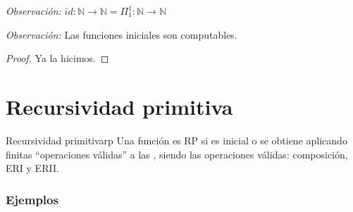 \bigskip
\textit{Observación:}
$id: \mathbb{N} \to \mathbb{N} = \Pi_1^1: \mathbb{N} \to \mathbb{N}$

\bigskip
\textit{Observación:}
Las funciones iniciales son computables.

\begin{proof}
    Ya la hicimos.
\end{proof}

\section{Recursividad primitiva}

%
\begin{definicion}{Recursividad primitiva}{rp}
    Una función es RP si es inicial o se obtiene aplicando finitas 
    ``operaciones válidas'' a las ,
    siendo las operaciones válidas: composición, ERI y ERII.
\end{definicion}


\subsubsection{Ejemplos}

